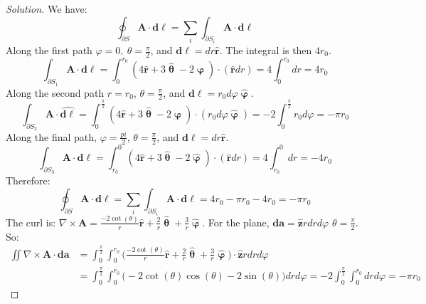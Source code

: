 \documentclass[oneside]{book}
\theoremstyle{mystyle}
\begin{document}
\begin{proof}[Solution]
We have:
\begin{equation*}
    \oint_{\partial S}\mathbf{A}\cdot \boldsymbol{d\ell} = \sum_{i} \int_{\partial S_{i}} \mathbf{A}\cdot \boldsymbol{d\ell}
\end{equation*}
Along the first path $\varphi=0,\ \theta = \frac{\pi}{2}$, and $\boldsymbol{d\ell} = dr\hat{\mathbf{r}}$. The integral is then $4r_0$.
\begin{equation*}
    \int_{\partial S_{1}}\mathbf{A}\cdot\boldsymbol{d\ell}=\int_{0}^{r_{0}}(4\hat{\mathbf{r}}+3\hat{\boldsymbol{\uptheta}}-2\hat{\boldsymbol{\upvarphi}})\cdot (\hat{\mathbf{r}}dr)=4\int_{0}^{r_{0}}dr=4r_{0}
\end{equation*}
Along the second path $r=r_0$, $\theta = \frac{\pi}{2}$, and $\boldsymbol{d\ell} = r_0 d\varphi \hat{\boldsymbol{\upvarphi}}$.
\begin{equation*}
    \int_{\partial S_{2}}\mathbf{A}\cdot \hat{\boldsymbol{d\ell}}=\int_{0}^{\frac{\pi}{2}}(4\hat{\mathbf{r}}+3\hat{\boldsymbol{\uptheta}}-2\hat{\boldsymbol{\upvarphi}})\cdot(r_{0}d\varphi\hat{\boldsymbol{\upvarphi}})=-2\int_{0}^{\frac{\pi}{2}}r_{0}d\varphi=-\pi r_{0}
\end{equation*}
Along the final path, $\varphi = \frac{pi}{2}$, $\theta = \frac{\pi}{2}$, and $ \boldsymbol{d\ell} = dr \hat{\mathbf{r}}$.
\begin{equation*}
    \int_{\partial S_{3}}\mathbf{A}\cdot \boldsymbol{d\ell}=\int_{r_{0}}^{0}(4\hat{\mathbf{r}}+3\hat{\boldsymbol{\uptheta}}-2\hat{\boldsymbol{\upvarphi}})\cdot (\hat{\mathbf{r}}dr)=4\int_{r_{0}}^{0}dr=-4r_{0}
\end{equation*}
Therefore:
\begin{equation*}
    \oint_{\partial S}\mathbf{A}\cdot\boldsymbol{d\ell}=\sum_{i}\int_{\partial S_{i}}\mathbf{A}\cdot\boldsymbol{d\ell}=4r_{0}-\pi r_{0}-4r_{0}=-\pi r_{0}
\end{equation*}
The curl is: $\nabla\times\mathbf{A}=\frac{-2\cot(\theta)}{r}\hat{\mathbf{r}}+\frac{2}{r}\hat{\boldsymbol{\uptheta}}+\frac{3}{r}\hat{\boldsymbol{\upvarphi}}$. For the plane, $\boldsymbol{da}=\hat{\mathbf{z}}rdrd\varphi$ $\theta=\frac{\pi}{2}$. So:
\begin{align*}
    \iint \nabla \times \mathbf{A} \cdot \boldsymbol{da} &= \int_{0}^{\frac{\pi}{2}}\int_{0}^{r_{0}} \bigg(\frac{-2\cot(\theta)}{r}\hat{\mathbf{r}}+\frac{2}{r}\hat{\boldsymbol{\uptheta}}+\frac{3}{r}\hat{\boldsymbol{\upvarphi}}\bigg)\cdot \hat{\mathbf{z}} rdrd\varphi\\
    &= \int_{0}^{\frac{\pi}{2}}\int_{0}^{r_{0}}\bigg(-2\cot(\theta)\cos(\theta)-2\sin(\theta)\bigg)drd\varphi= -2\int_{0}^{\frac{\pi}{2}}\int_{0}^{r_{0}}drd\varphi=-\pi r_{0}
\end{align*}
\end{proof}
\end{document}
